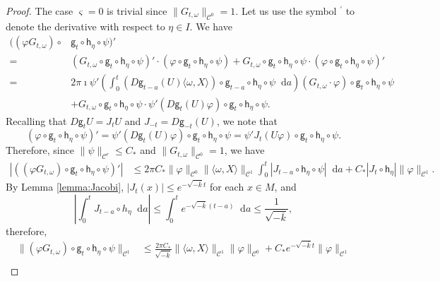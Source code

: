 \documentclass[10pt,a4paper]{amsart}
\newcommand \cC {{\mathscr{C}}}
\newcommand*{\diff}{\mathop{}\!\mathrm{d}}
\newcommand{\geo}{\mathsf{g}}
\newcommand{\horo}{\mathsf{h}}
\begin{document}
\begin{proof}
The case $\varsigma=0$ is trivial since $ \|G_{t,\omega}\|_{\cC^0}=1$.
Let us use the symbol $^\prime$ to denote the derivative with respect to $\eta \in I$. We have
\[
\begin{split}
((\varphi G_{t,\omega})\circ & \geo_t\circ \horo_\eta\circ \psi )'\\
%
=&(G_{t,\omega}\circ \geo_t\circ \horo_\eta \circ \psi)'\cdot (\varphi\circ \geo_t\circ \horo_\eta \circ \psi)+ G_{t,\omega}\circ \geo_t\circ \horo_\eta \circ \psi\cdot (\varphi\circ \geo_t\circ \horo_\eta \circ \psi)'\\
%
=&2\pi \imath\psi'\left(  \int_0^t (D\geo_{t-a}(U) \langle \omega, X\rangle)\circ \geo_{t-a}\circ \horo_\eta\circ \psi \diff a   \right) (G_{t,\omega}\cdot\varphi)\circ \geo_t\circ \horo_\eta \circ \psi\\
%
&+G_{t,\omega}\circ \geo_t\circ \horo_\eta \circ \psi\cdot \psi' (D\geo_t(U)\varphi)\circ \geo_t\circ \horo_\eta \circ \psi.
\end{split}
\]
Recalling that $D\geo_tU=J_t U$ and $J_{-t}=D\geo_{-t}(U)$, we note that
\begin{equation}\label{eq:great}
(\varphi\circ \geo_t\circ \horo_\eta \circ \psi)'=\psi' (D\geo_t(U)\varphi)\circ \geo_t\circ \horo_\eta \circ \psi= \psi' J_t (U\varphi)\circ \geo_t\circ \horo_\eta \circ \psi.
\end{equation}
Therefore, since $\|\psi\|_{\cC^r}\le C_*$ and $\|G_{t,\omega}\|_{\cC^0}=1$, we have
\[
\begin{split}
|((\varphi G_{t,\omega})\circ \geo_t\circ \horo_\eta\circ \psi )'| 
&\le 2\pi C_*\|\varphi\|_{\cC^0}\|\langle \omega, X \rangle \|_{\cC^1}\int_0^t |J_{t-a} \circ \horo_\eta \circ \psi |\diff  a+C_*|J_t\circ \horo_\eta|\|\varphi\|_{\cC^1}.
\end{split}
\]
By Lemma \ref{lemma:Jacobi}, $|J_t(x)|\le e^{-\sqrt{-\overline k}t}$ for each $x\in M$, and
\begin{equation}\label{eq:intJ}
\left|\int_0^t J_{t-a}\circ h_\eta \diff a\right|\le \int_0^t e^{-\sqrt{-\overline k}(t-a)}\diff a \le \dfrac{1}{\sqrt{-\overline k}},
\end{equation}
therefore,
\begin{equation}\label{eq:C1G}
\begin{split}
\|(\varphi G_{t,\omega})\circ \geo_t\circ \horo_\eta\circ \psi \|_{\cC^1} 
&\le \frac{2\pi C_*}{\sqrt{-\overline k}}\|\langle \omega, X \rangle \|_{\cC^1} \|\varphi\|_{\cC^0}+C_*e^{-\sqrt{-\overline k}t}\|\varphi\|_{\cC^1}\\

\end{split}
\end{equation}
\end{proof}
\end{document}
